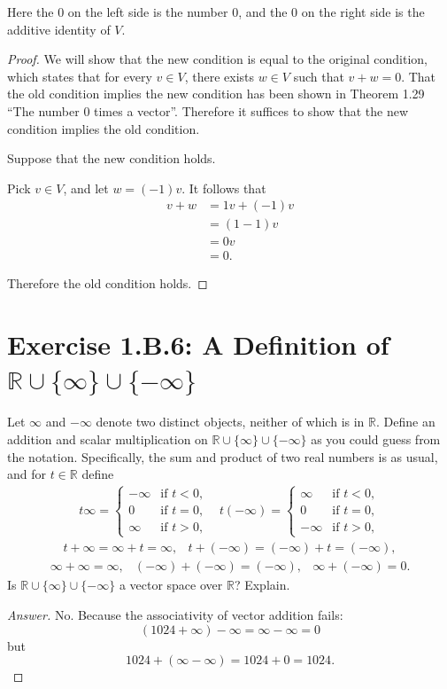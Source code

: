 Here the $0$ on the left side is the number $0$, and the $0$ on the right side is the additive identity of $V$. 
\begin{proof}
We will show that the new condition is equal to the original condition, which states that for every $v\in V$, there exists $w\in V$ such that $v+w=0$. That the old condition implies the new condition has been shown in Theorem 1.29 ``The number $0$ times a vector''. Therefore it suffices to show that the new condition implies the old condition.

Suppose that the new condition holds.

Pick $v\in V$, and let $w=(-1)v$. It follows that
\begin{equation*}
\begin{split}
v+w&=1v+(-1)v\\
&=(1-1)v\\
&=0v\\
&=0.
\end{split}
\end{equation*}

Therefore the old condition holds.
\end{proof}

\section{Exercise 1.B.6: A Definition of $\mathbb{R}\cup\{\infty\}\cup\{-\infty\}$}
Let $\infty$ and $-\infty$ denote two distinct objects, neither of which is in $\mathbb{R}$. Define an addition and scalar multiplication on $\mathbb{R}\cup\{\infty\}\cup\{-\infty\}$ as you could guess from the notation. Specifically, the sum and product of two real numbers is as usual, and for $t\in\mathbb{R}$ define
\[
\begin{array}{cc}
t\infty=\begin{cases} 
-\infty & \text{if } t<0,\\
0 & \text{if } t=0,\\
\infty & \text{if } t>0,
\end{cases}
&
t(-\infty)=\begin{cases} 
\infty & \text{if } t<0,\\
0 & \text{if } t=0,\\
-\infty & \text{if } t>0,
\end{cases}
\end{array}
\]
\[
\begin{array}{cc}
t+\infty=\infty+t=\infty,
&
t+(-\infty)=(-\infty)+t=(-\infty),
\end{array}
\]
\[
\begin{array}{ccc}
\infty+\infty=\infty,
&
(-\infty)+(-\infty)=(-\infty),
&
\infty+(-\infty)=0.
\end{array}
\]
Is $\mathbb{R}\cup\{\infty\}\cup\{-\infty\}$ a vector space over $\mathbb{R}$? Explain.
\begin{proof}[Answer]
No. Because the associativity of vector addition fails:
\[
(1024+\infty)-\infty=\infty-\infty=0
\]
but
\[
1024+(\infty-\infty)=1024+0=1024.
\]
\end{proof}


